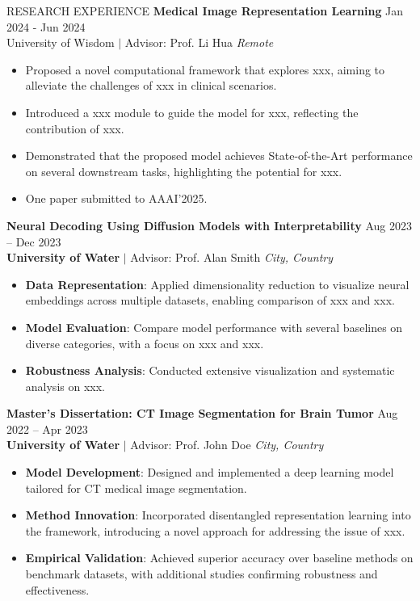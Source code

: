 \documentclass{resume} %
\begin{document}
\begin{rSection}{RESEARCH EXPERIENCE}
\textbf{Medical Image Representation Learning} \hfill Jan 2024 - Jun 2024\\
University of Wisdom $\mid $ Advisor: Prof. Li Hua
\hfill  \textit{Remote}
 \begin{itemize}
    \itemsep -3pt {} 
    \item Proposed a novel computational framework that explores xxx, aiming to alleviate the challenges of xxx in clinical scenarios.
    \item Introduced a xxx module to guide the model for xxx, reflecting the contribution of xxx.
    \item Demonstrated that the proposed model achieves State-of-the-Art performance on several downstream tasks, highlighting the potential for xxx.
    \item One paper submitted to AAAI'2025.
 \end{itemize}

 
\textbf{Neural Decoding Using Diffusion Models with Interpretability} \hfill Aug 2023 -- Dec 2023\\
\raggedleft \textbf{University of Water} $\mid$ Advisor: Prof. Alan Smith \hfill \textit{City, Country} \raggedright
\begin{itemize}
    \itemsep -3pt {}
    \item \textbf{Data Representation}: Applied dimensionality reduction to visualize neural embeddings across multiple datasets, enabling comparison of xxx and xxx.  
    \item \textbf{Model Evaluation}: Compare model performance with several baselines on diverse categories, with a focus on xxx and xxx.  
    \item \textbf{Robustness Analysis}: Conducted extensive visualization and systematic analysis on xxx.  
\end{itemize}


 
\textbf{Master's Dissertation: CT Image Segmentation for Brain Tumor} \hfill Aug 2022 -- Apr 2023\\
\textbf{University of Water} $\mid$ Advisor: Prof. John Doe \hfill \textit{City, Country}
\begin{itemize}
    \itemsep -3pt {}
    \item \textbf{Model Development}: Designed and implemented a deep learning model tailored for CT medical image segmentation.  
    \item \textbf{Method Innovation}: Incorporated disentangled representation learning into the framework, introducing a novel approach for addressing the issue of xxx.  
    \item \textbf{Empirical Validation}: Achieved superior accuracy over baseline methods on benchmark datasets, with additional studies confirming robustness and effectiveness.  
\end{itemize}


\end{rSection}
\end{document}
